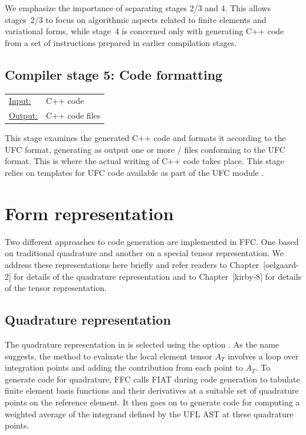 We emphasize the importance of separating stages 2/3 and 4. This
allows stages~2/3 to focus on algorithmic aspects related to finite
elements and variational forms, while stage~4 is concerned only with
generating C++ code from a set of instructions prepared in earlier
compilation stages.

\subsection{Compiler stage 5: Code formatting}

\begin{tabular}{ll}
  \underline{Input:}  & C++ code \\
  \underline{Output:} & C++ code files
\end{tabular}
\vspace{0.5cm}

This stage examines the generated C++ code and formats it according to
the UFC format, generating as output one or more / files
conforming to the UFC format. This is where the actual writing of C++
code takes place. This stage relies on templates for UFC code
available as part of the UFC module .

\section{Form representation}
\label{sec:representation}

Two different approaches to code generation are implemented in
FFC. One based on traditional quadrature and another on a special
tensor representation. We address these representations here briefly
and refer readers to Chapter~[oelgaard-2] for details of the quadrature
representation and to Chapter~[kirby-8] for details of the tensor
representation.
\subsection{Quadrature representation}

The quadrature representation in \ffc{} is selected using the
option .  As the name suggests, the method to
evaluate the local element tensor $A_T$ involves a loop over
integration points and adding the contribution from each point to
$A_T$. To generate code for quadrature, FFC calls FIAT during code
generation to tabulate finite element basis functions and their
derivatives at a suitable set of quadrature points on the reference
element. It then goes on to generate code for computing a weighted
average of the integrand defined by the UFL AST at these quadrature
points.

